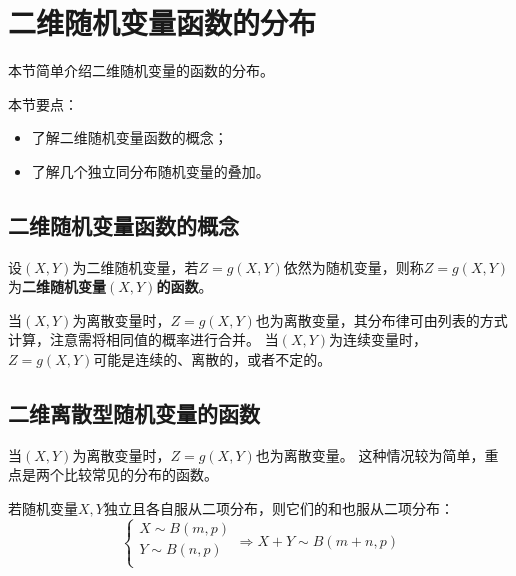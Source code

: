 \section{二维随机变量函数的分布}

本节简单介绍二维随机变量的函数的分布。

本节要点：
\begin{itemize}
    \item 了解二维随机变量函数的概念；
    \item 了解几个独立同分布随机变量的叠加。
\end{itemize}

\subsection{二维随机变量函数的概念}

\begin{definition}[二维随机变量的函数]
设$\left( X,Y \right) $为二维随机变量，若$Z=g\left( X,Y \right) $依然为随机变量，则称$Z=g\left( X,Y \right) $为{\bf 二维随机变量$\left( X,Y \right) $的函数}。
\end{definition}

当$\left( X,Y \right) $为离散变量时，$Z=g\left( X,Y \right) $也为离散变量，其分布律可由列表的方式计算，注意需将相同值的概率进行合并。
当$\left( X,Y \right) $为连续变量时，$Z=g\left( X,Y \right) $可能是连续的、离散的，或者不定的。

\subsection{二维离散型随机变量的函数}

\begin{tcolorbox}
当$\left( X,Y \right) $为离散变量时，$Z=g\left( X,Y \right) $也为离散变量。
这种情况较为简单，重点是两个比较常见的分布的函数。
\end{tcolorbox}

\begin{theorem}
若随机变量$X,Y$独立且各自服从二项分布，则它们的和也服从二项分布：
\[
\begin{cases}
	X\sim B\left( m,p \right)\\
	Y\sim B\left( n,p \right)\\
\end{cases}\Rightarrow X+Y\sim B\left( m+n,p \right)
\]
\end{theorem}

